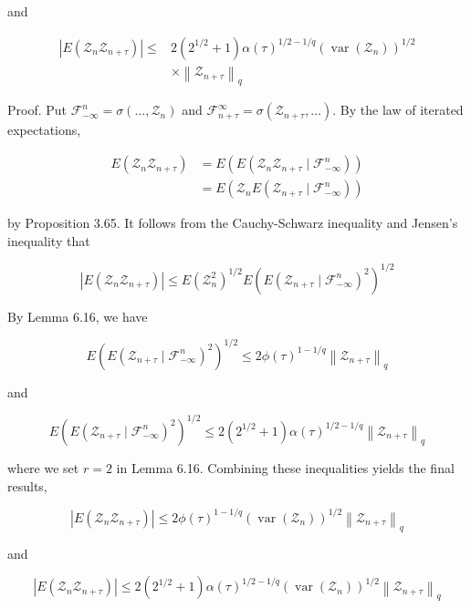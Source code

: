 \documentclass[10pt]{article}
\begin{document}
and

$$
\begin{aligned}
\left|E\left(\mathcal{Z}_{n} \mathcal{Z}_{n+\tau}\right)\right| \leq & 2\left(2^{1 / 2}+1\right) \alpha(\tau)^{1 / 2-1 / q}\left(\operatorname{var}\left(\mathcal{Z}_{n}\right)\right)^{1 / 2} \\
& \times\left\|\mathcal{Z}_{n+\tau}\right\|_{q}
\end{aligned}
$$

Proof. Put $\mathcal{F}_{-\infty}^{n}=\sigma\left(\ldots, \mathcal{Z}_{n}\right)$ and $\mathcal{F}_{n+\tau}^{\infty}=\sigma\left(\mathcal{Z}_{n+\tau}, \ldots\right)$. By the law of iterated expectations,

$$
\begin{aligned}
E\left(\mathcal{Z}_{n} \mathcal{Z}_{n+\tau}\right) & =E\left(E\left(\mathcal{Z}_{n} \mathcal{Z}_{n+\tau} \mid \mathcal{F}_{-\infty}^{n}\right)\right) \\
& =E\left(\mathcal{Z}_{n} E\left(\mathcal{Z}_{n+\tau} \mid \mathcal{F}_{-\infty}^{n}\right)\right)
\end{aligned}
$$

by Proposition 3.65. It follows from the Cauchy-Schwarz inequality and Jensen's inequality that

$$
\left|E\left(\mathcal{Z}_{n} \mathcal{Z}_{n+\tau}\right)\right| \leq E\left(\mathcal{Z}_{n}^{2}\right)^{1 / 2} E\left(E\left(\mathcal{Z}_{n+\tau} \mid \mathcal{F}_{-\infty}^{n}\right)^{2}\right)^{1 / 2}
$$

By Lemma 6.16, we have

$$
E\left(E\left(\mathcal{Z}_{n+\tau} \mid \mathcal{F}_{-\infty}^{n}\right)^{2}\right)^{1 / 2} \leq 2 \phi(\tau)^{1-1 / q}\left\|\mathcal{Z}_{n+\tau}\right\|_{q}
$$

and

$$
E\left(E\left(\mathcal{Z}_{n+\tau} \mid \mathcal{F}_{-\infty}^{n}\right)^{2}\right)^{1 / 2} \leq 2\left(2^{1 / 2}+1\right) \alpha(\tau)^{1 / 2-1 / q}\left\|\mathcal{Z}_{n+\tau}\right\|_{q}
$$

where we set $r=2$ in Lemma 6.16. Combining these inequalities yields the final results,

$$
\left|E\left(\mathcal{Z}_{n} \mathcal{Z}_{n+\tau}\right)\right| \leq 2 \phi(\tau)^{1-1 / q}\left(\operatorname{var}\left(\mathcal{Z}_{n}\right)\right)^{1 / 2}\left\|\mathcal{Z}_{n+\tau}\right\|_{q}
$$

and

$$
\left|E\left(\mathcal{Z}_{n} \mathcal{Z}_{n+\tau}\right)\right| \leq 2\left(2^{1 / 2}+1\right) \alpha(\tau)^{1 / 2-1 / q}\left(\operatorname{var}\left(\mathcal{Z}_{n}\right)\right)^{1 / 2}\left\|\mathcal{Z}_{n+\tau}\right\|_{q}
$$
\end{document}
